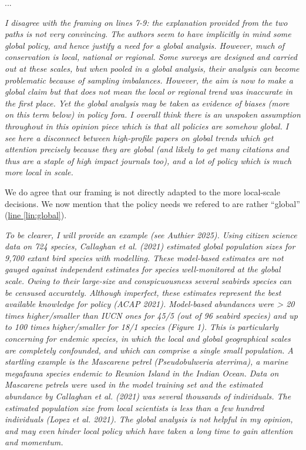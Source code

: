 \documentclass[11pt,letter]{article}
\begin{document}
...

\begin{mybox}
\emph{I disagree with the framing on lines 7-9: the explanation provided from the two paths is not
very convincing. The authors seem to have implicitly in mind some global policy, and hence
justify a need for a global analysis. However, much of conservation is local, national or
regional. Some surveys are designed and carried out at these scales, but when pooled in a
global analysis, their analysis can become problematic because of sampling imbalances.
However, the aim is now to make a global claim but that does not mean the local or regional
trend was inaccurate in the first place. Yet the global analysis may be taken as evidence of
biases (more on this term below) in policy fora. I overall think there is an unspoken assumption
throughout in this opinion piece which is that all policies are somehow global. I see here a
disconnect between high-profile papers on global trends which get attention precisely because
they are global (and likely to get many citations and thus are a staple of high impact journals
too), and a lot of policy which is much more local in scale.}  
\end{mybox}

We do agree that our framing is not directly adapted to the more local-scale decisions. We now mention that the policy needs we refered to are rather ``global'' (\href{file:forecastflows_r2\#lintarget:global}{line \ref*{lin:global}}).

\begin{mybox}
\emph{To be clearer, I will provide an example (see Authier 2025). Using citizen science data on 724
species, Callaghan et al. (2021) estimated global population sizes for 9,700 extant bird species
with modelling. These model-based estimates are not gauged against independent estimates
for species well-monitored at the global scale. Owing to their large-size and conspicuousness
several seabirds species can be censused accurately. Although imperfect, these estimates
represent the best available knowledge for policy (ACAP 2021). Model-based abundances
were > 20 times higher/smaller than IUCN ones for 45/5 (out of 96 seabird species) and up to
100 times higher/smaller for 18/1 species (Figure 1). This is particularly concerning for
endemic species, in which the local and global geographical scales are completely confounded,
and which can comprise a single small population. A startling example is the Mascarene petrel
(Pseudobulweria aterrima), a marine megafauna species endemic to Reunion Island in the Indian
Ocean. Data on Mascarene petrels were used in the model training set and the estimated
abundance by Callaghan et al. (2021) was several thousands of individuals. The estimated
population size from local scientists is less than a few hundred individuals (Lopez et al. 2021).
The global analysis is not helpful in my opinion, and may even hinder local policy which have
taken a long time to gain attention and momentum.} 
\end{mybox}
\end{document}
